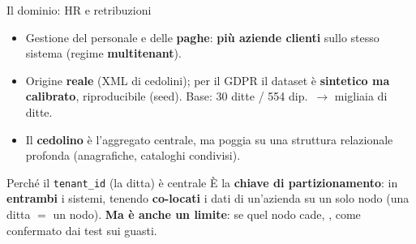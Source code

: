 \documentclass[aspectratio=169,11pt]{beamer}
\begin{document}
\begin{frame}{Il dominio: HR e retribuzioni}
  \begin{itemize}
    \item Gestione del personale e delle \textbf{paghe}: \textbf{più aziende clienti} sullo stesso sistema
          (regime \textbf{multitenant}).
    \item Origine \textbf{reale} (XML di cedolini); per il GDPR il dataset è \textbf{sintetico ma calibrato},
          riproducibile (seed). Base: 30 ditte / 554 dip.\ $\rightarrow$ migliaia di ditte.
    \item Il \textbf{cedolino} è l'aggregato centrale, ma poggia su una struttura relazionale profonda
          (anagrafiche, cataloghi condivisi).
  \end{itemize}
  \vspace{0.3em}
  \begin{keyblock}{Perché il \texttt{tenant\_id} (la ditta) è centrale}
    È la \textbf{chiave di partizionamento}:  in \textbf{entrambi} i sistemi, tenendo \textbf{co-locati} i dati di un'azienda su un solo nodo (una ditta $=$ un nodo). \textbf{Ma è anche un limite}: se quel nodo cade, , come confermato dai test sui guasti.
  \end{keyblock}
\end{frame}

\end{document}

